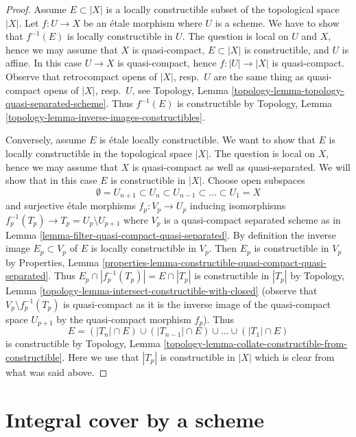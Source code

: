 \documentclass{stacks-project}
\theoremstyle{plain}
\theoremstyle{definition}
\theoremstyle{remark}
\numberwithin{equation}{subsection}
\begin{document}
\begin{proof}
Assume $E \subset |X|$ is a locally constructible subset of
the topological space $|X|$. Let $f : U \to X$ be an
\'etale morphism where $U$ is a scheme. We have to show that
$f^{-1}(E)$ is locally constructible in $U$. The question is
local on $U$ and $X$, hence we may assume that $X$ is quasi-compact,
$E \subset |X|$ is constructible, and $U$ is affine.
In this case $U \to X$ is quasi-compact, hence
$f : |U| \to |X|$ is quasi-compact. Observe that retrocompact
opens of $|X|$, resp.\ $U$ are the same thing as quasi-compact opens
of $|X|$, resp.\ $U$, see
Topology, Lemma \ref{topology-lemma-topology-quasi-separated-scheme}.
Thus $f^{-1}(E)$ is constructible by Topology, Lemma
\ref{topology-lemma-inverse-images-constructibles}.

\medskip\noindent
Conversely, assume $E$ is \'etale locally constructible.
We want to show that $E$ is locally constructible in the
topological space $|X|$.
The question is local on $X$, hence we may assume that $X$ is
quasi-compact as well as quasi-separated. We will show that
in this case $E$ is constructible in $|X|$.
Choose open subspaces
$$
\emptyset = U_{n + 1} \subset
U_n \subset U_{n - 1} \subset \ldots \subset U_1 = X
$$
and surjective \'etale morphisms $f_p : V_p \to U_p$
inducing isomorphisms $f_p^{-1}(T_p) \to T_p = U_p \setminus U_{p + 1}$
where $V_p$ is a quasi-compact separated scheme as in
Lemma \ref{lemma-filter-quasi-compact-quasi-separated}.
By definition the inverse image $E_p \subset V_p$ of $E$ is
locally constructible in $V_p$. Then $E_p$ is constructible in $V_p$
by Properties, Lemma
\ref{properties-lemma-constructible-quasi-compact-quasi-separated}.
Thus $E_p \cap |f_p^{-1}(T_p)| = E \cap |T_p|$ is constructible
in $|T_p|$ by
Topology, Lemma \ref{topology-lemma-intersect-constructible-with-closed}
(observe that $V_p \setminus f_p^{-1}(T_p)$ is quasi-compact as it is the
inverse image of the quasi-compact space $U_{p + 1}$ by the
quasi-compact morphism $f_p$).
Thus
$$
E = (|T_n| \cap E) \cup (|T_{n - 1}| \cap E) \cup \ldots \cup
(|T_1| \cap E)
$$
is constructible by
Topology, Lemma \ref{topology-lemma-collate-constructible-from-constructible}.
Here we use that $|T_p|$ is constructible in $|X|$ which is clear from
what was said above.
\end{proof}





\section{Integral cover by a scheme}
\label{section-integral-cover}
\end{document}
